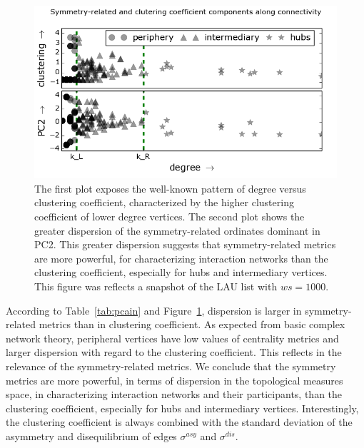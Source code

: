 \documentclass[%
aip,
jmp,%
amsmath,amssymb,
reprint,%
]{revtex4-1}
\begin{document}
\begin{figure} 
\centering
\includegraphics[width=.45\textwidth]{figs/im13PCAPLOT__}
\caption{The first plot exposes the well-known pattern of degree versus clustering coefficient, characterized by the higher clustering coefficient of lower degree vertices.
The second plot shows the greater dispersion of the symmetry-related ordinates dominant in PC2.
This greater dispersion suggests that symmetry-related metrics are more powerful,
for characterizing interaction networks than the clustering coefficient,
especially for hubs and intermediary vertices.
This figure was reflects a snapshot of the LAU list with $ws= 1000$.}

\label{fig:sym}
\end{figure}

According to Table~\ref{tab:pcain} and Figure~\ref{fig:sym},
dispersion is larger in symmetry-related metrics than in clustering coefficient. As expected from basic complex network theory, peripheral vertices have low values of centrality metrics and larger dispersion with regard to the clustering coefficient.
This reflects in the relevance of the symmetry-related metrics.
We conclude that the symmetry metrics are more powerful, in terms of dispersion in the topological measures space, in characterizing interaction networks and their participants, than the clustering coefficient, especially for hubs and intermediary vertices.
Interestingly, the clustering coefficient is always combined
with the standard deviation of the asymmetry and disequilibrium
of edges $\sigma^{asy}$ and $\sigma^{dis}$.
\end{document}
